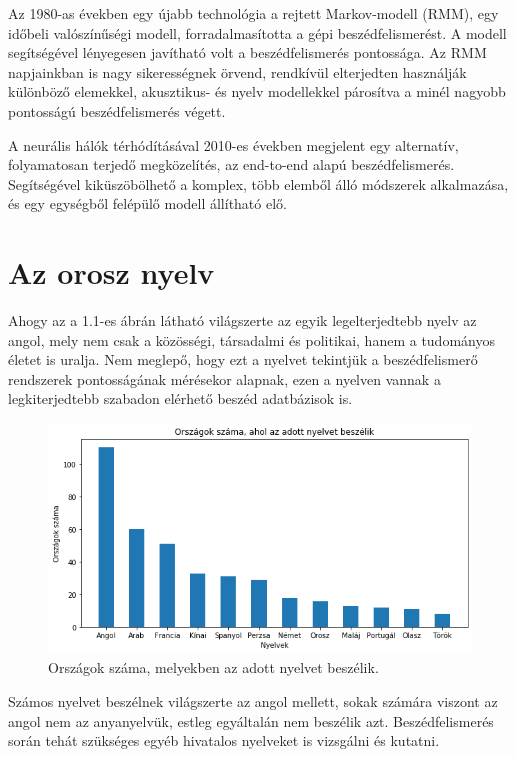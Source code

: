 Az 1980-as években egy újabb technológia a rejtett Markov-modell (RMM), egy időbeli valószínűségi modell, forradalmasította a gépi beszédfelismerést. A modell segítségével lényegesen javítható volt a beszédfelismerés pontossága. Az RMM napjainkban is nagy sikerességnek örvend, rendkívül elterjedten használják különböző elemekkel, akusztikus- és nyelv modellekkel párosítva a minél nagyobb pontosságú beszédfelismerés végett.

A neurális hálók térhódításával 2010-es években megjelent egy alternatív, folyamatosan terjedő megközelítés, az end-to-end alapú beszédfelismerés. Segítségével kiküszöbölhető a komplex, több elemből álló módszerek alkalmazása, és egy egységből felépülő modell állítható elő.

\section{Az orosz nyelv}

Ahogy az a 1.1-es ábrán látható világszerte az egyik legelterjedtebb nyelv az angol, mely nem csak a közösségi, társadalmi és politikai, hanem a tudományos életet is uralja. Nem meglepő, hogy ezt a nyelvet tekintjük a beszédfelismerő rendszerek pontosságának mérésekor alapnak, ezen a nyelven vannak a legkiterjedtebb szabadon elérhető beszéd adatbázisok is.

\begin{figure}[!ht]
\centering
\includegraphics[width=150mm, keepaspectratio]{figures/languagesInCountries.png}
\caption{Országok száma, melyekben az adott nyelvet beszélik. \cite{nyelvekvilaga}}
\end{figure}

Számos nyelvet beszélnek világszerte az angol mellett, sokak számára viszont az angol nem az anyanyelvük, estleg egyáltalán nem beszélik azt. Beszédfelismerés során tehát szükséges egyéb hivatalos nyelveket is vizsgálni és kutatni.

